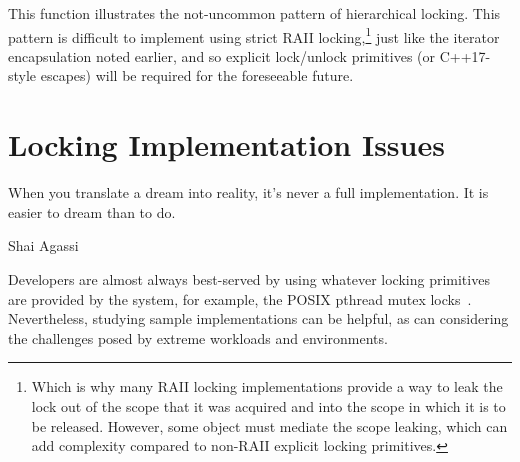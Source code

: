 
This function illustrates the not-uncommon pattern of hierarchical
locking.
This pattern is difficult to implement using strict RAII locking,\footnote{
	Which is why many RAII locking implementations provide a way
	to leak the lock out of the scope that it was acquired and into
	the scope in which it is to be released.
	However, some object must mediate the scope leaking, which can
	add complexity compared to non-RAII explicit locking primitives.}
just like the iterator encapsulation noted earlier, and so explicit
lock/unlock primitives (or C++17-style  escapes) will
be required for the foreseeable future.

\section{Locking Implementation Issues}
\label{sec:locking:Locking Implementation Issues}
%
\epigraph{When you translate a dream into reality, it's never a full
	  implementation.
	  It is easier to dream than to do.}
	 {Shai Agassi}

Developers are almost always best-served by using whatever locking
primitives are provided by the system, for example, the POSIX
pthread mutex locks~\cite{OpenGroup1997pthreads,Butenhof1997pthreads}.
Nevertheless, studying sample implementations can be helpful,
as can considering the challenges posed by extreme workloads and
environments.

